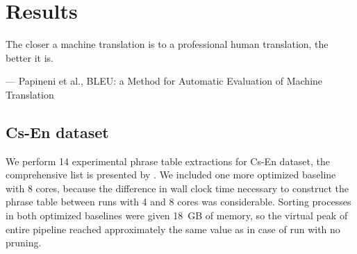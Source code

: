 \chapter{Results}
\label{chap:results}

\setlength{\epigraphwidth}{1.0\textwidth}
\epigraph{The closer a machine translation is to a professional human translation, the better it is.}{--- Papineni et al., BLEU: a Method for Automatic Evaluation of Machine Translation}

\section{Cs-En dataset}
\label{sec:cs-en-results}

We perform 14 experimental phrase table extractions for Cs-En dataset,
the comprehensive list is presented by .
We included one more optimized baseline with 8 cores, because the difference in
wall clock time necessary to construct the phrase table between runs with 4 and 8 cores
was considerable.
Sorting processes in both optimized baselines were given 18~GB of memory, so the virtual
peak of entire pipeline reached approximately the same value as in case of \eppex{}
run with no pruning.

